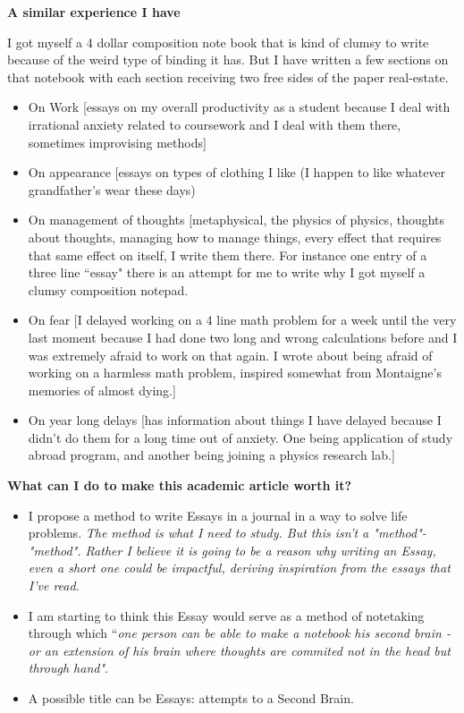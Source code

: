 \documentclass[letter]{article}
\begin{document}
\textbf{A similar experience I have}

I got myself a 4 dollar composition note book that is kind of clumsy to write because of the weird type of binding it has. But I have written a few sections on that notebook with each section receiving two free sides of the paper real-estate. 

\begin{itemize}
	\item On Work [essays on my overall productivity as a student because I deal with irrational anxiety related to coursework and I deal with them there, sometimes improvising methods]
	\item On appearance [essays on types of clothing I like (I happen to like whatever grandfather's wear these days)
\item On management of thoughts [metaphysical, the physics of physics, thoughts about thoughts, managing how to manage things, every effect that requires that same effect on itself, I write them there. For instance one entry of a three line ``essay" there is an attempt for me to write why I got myself a clumsy composition notepad. 
\item On fear [I delayed working on a 4 line math problem for a week until the very last moment because I had done two long and wrong calculations before and I was extremely afraid to work on that again. I wrote about being afraid of working on a harmless math problem, inspired somewhat from Montaigne's memories of almost dying.]
\item On year long delays [has information about things I have delayed because I didn't do them for a long time out of anxiety. One being application of study abroad program, and another being joining a physics research lab.] 
\end{itemize}

\textbf{What can I do to make this academic article worth it?}
\begin{itemize}
	\item I propose a method to write Essays in a journal in a way to solve life problems. \emph{The method is what I need to study. But this isn't a "method"-"method". Rather I believe it is going to be a reason why writing an Essay, even a short one could be impactful, deriving inspiration from the essays that I've read. } 
	\item I am starting to think this Essay would serve as a method of notetaking through which ``\emph{one person can be able to make a notebook his second brain - or an extension of his brain where thoughts are commited not in the head but through hand"}. 
	\item A possible title can be \textsf{Essays: attempts to a Second Brain.}
\end{itemize}
\end{document}
